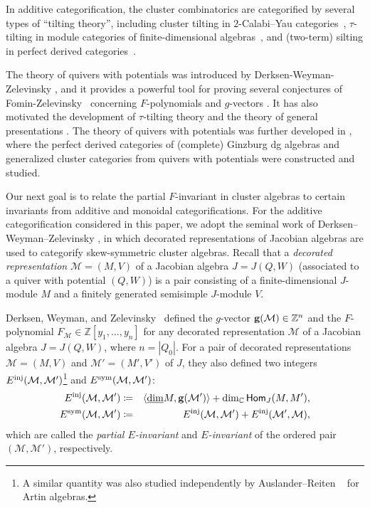 \documentclass[12pt]{amsart}
\theoremstyle{definition}
\theoremstyle{remark}
\numberwithin{equation}{section}
\newcommand{\opname}[1]{\operatorname{\mathsf{#1}}}
\newcommand{\Hom}{\opname{Hom}}
\begin{document}
In additive categorification, the cluster combinatorics are categorified by several types of ``tilting theory'', including cluster tilting in $2$-Calabi--Yau categories~\cite{bmrrt_2006,IY08,Amiot_2009}, $\tau$-tilting in module categories of finite-dimensional algebras~\cite{air_2014}, and (two-term) silting in perfect derived categories~\cite{AI12,DK-2015}.

The theory of quivers with potentials was introduced by Derksen-Weyman-Zelevinsky \cite{DWZ08,DWZ10}, and it provides a powerful tool for proving several conjectures of Fomin-Zelevinsky~\cite{fomin_zelevinsky_2007} concerning $F$-polynomials and $g$-vectors \cite[Theorem~1.7]{DWZ10}.  It has also motivated the development of 
$\tau$-tilting theory \cite{air_2014} and the theory of general presentations \cite{DK-2015}. The theory of quivers with potentials was further developed in \cite{Amiot_2009,Keller-Yang_2011,Plamondon-2011}, where the perfect derived categories of (complete) Ginzburg dg algebras and generalized cluster categories from quivers with potentials were constructed and studied. 

Our next goal is to relate the partial $F$-invariant in cluster algebras to certain invariants from additive and monoidal categorifications. For the additive categorification considered in this paper, we adopt the seminal work of Derksen--Weyman--Zelevinsky \cite{DWZ08,DWZ10}, in which decorated representations of Jacobian algebras are used to categorify skew-symmetric cluster algebras. Recall that a {\em decorated representation} $\mathcal M=(M,V)$ of a Jacobian algebra $J=J(Q,W)$ (associated to a quiver with potential $(Q,W)$) is a pair consisting of a finite-dimensional $J$-module $M$ and a finitely generated semisimple $J$-module $V$.


 Derksen, Weyman, and Zelevinsky~\cite{DWZ10} defined   the $g$-vector ${\bf g}(\mathcal M)\in\mathbb Z^n$ and the $F$-polynomial $F_{\mathcal M}\in\mathbb Z[y_1,\ldots,y_n]$ for any decorated representation $\mathcal M$ of a Jacobian algebra $J=J(Q,W)$, where $n=|Q_0|$. For a pair of decorated representations $\mathcal M=(M,V)$ and $\mathcal M'=(M',V')$ of $J$, they also defined two integers $E^{\rm inj}(\mathcal M,\mathcal M')$\footnote{
 A similar quantity was also studied independently by Auslander--Reiten ~\cite[Theorem~1.4]{AR85} for Artin algebras.} and $E^{\rm sym}(\mathcal M,\mathcal M')$:
 \begin{eqnarray*}
     E^{\rm inj}(\mathcal M,\mathcal M')&\coloneq&\langle\underline{\dim} M, \mathbf{g}(\mathcal{M}')\rangle + \dim_{\mathbb C} \Hom_J(M, M' ),\\
     E^{\rm sym}(\mathcal M,\mathcal M')&\coloneq& E^{\rm inj}(\mathcal M,\mathcal M')+ E^{\rm inj}(\mathcal M',\mathcal M),
 \end{eqnarray*}
 which are called the {\em partial $E$-invariant} and {\em $E$-invariant} of the ordered pair $(\mathcal M,\mathcal M')$, respectively.
 
\end{document}
